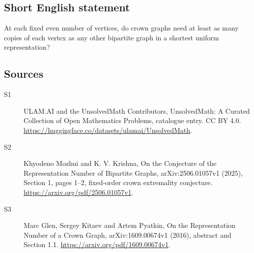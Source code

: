 \documentclass[11pt]{article}
\begin{document}
\subsection{Short English statement}
At each fixed even number of vertices, do crown graphs need at least as many copies of each vertex as any other bipartite graph in a shortest uniform representation?
\subsection{Sources}
\begin{description}
\item[\hypertarget{source:statement:1}{S1}] ULAM.AI and the UnsolvedMath Contributors, UnsolvedMath: A Curated Collection of Open Mathematics Problems, catalogue entry. CC BY 4.0. \url{https://huggingface.co/datasets/ulamai/UnsolvedMath}.
\item[\hypertarget{source:statement:2}{S2}] Khyodeno Mozhui and K. V. Krishna, On the Conjecture of the Representation Number of Bipartite Graphs, arXiv:2506.01057v1 (2025), Section 1, pages 1--2, fixed-order crown extremality conjecture. \url{https://arxiv.org/pdf/2506.01057v1}.
\item[\hypertarget{source:statement:3}{S3}] Marc Glen, Sergey Kitaev and Artem Pyatkin, On the Representation Number of a Crown Graph, arXiv:1609.00674v1 (2016), abstract and Section 1.1. \url{https://arxiv.org/pdf/1609.00674v1}.
\end{description}
\label{end:statement}
\end{document}
